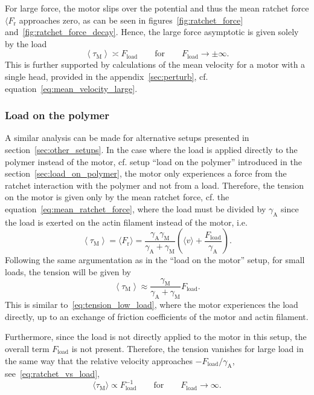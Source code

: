 \documentclass[aps,pre,twocolumn,showpacs,showkeys,superscriptaddress,floatfix]{revtex4-1}
\begin{document}
For large force, the motor slips over the potential and thus the mean ratchet force $\langle F_\text{r}$ approaches zero,
as can be seen in figures~\ref{fig:ratchet_force} and~\ref{fig:ratchet_force_decay}.
Hence, the large force asymptotic is given solely by the load
\begin{equation}
\left\langle \tau_\text{M} \right\rangle
\asymp F_\text{load} 
\qquad \text{for} \qquad F_\text{load} \to \pm \infty. 
\label{eq:tension_large_load}
\end{equation}
This is further supported by calculations of the mean velocity for a motor with a single head, provided in the appendix~\ref{sec:perturb}, cf. equation~\eqref{eq:mean_velocity_large}.


\subsubsection{Load on the polymer}
A similar analysis can be made for alternative setups presented in section~\ref{sec:other_setups}. 
In the case where the load is applied directly to the polymer instead of the motor, cf. setup ``load on the polymer'' introduced in the section~\ref{sec:load_on_polymer}, 
the motor only experiences a force from the ratchet interaction with the polymer and not from a load. 
Therefore, the tension on the motor is given only by the mean ratchet force,  
cf. the equation~\eqref{eq:mean_ratchet_force},  
where the load must be divided by $\gamma_\text{A}$ since the load is exerted on the actin filament instead of the motor,
i.e.
\begin{equation}
\left\langle \tau_\text{M} \right\rangle 
= \langle F_\text{r} \rangle 
= \frac{\gamma_\text{A}\gamma_\text{M}}{\gamma_\text{A} + \gamma_\text{M} } \left(\langle v \rangle + \frac{F_\text{load}}{\gamma_\text{A}}\right) . 
\label{eq:tension_load_on_polymer}
\end{equation}
Following the same argumentation as in the ``load on the motor'' setup, for small loads, the tension will be given by
\begin{equation}
\left\langle \tau_\text{M} \right\rangle
\approx \frac{\gamma_\text{M}}{\gamma_\text{A}+\gamma_\text{M}} F_\text{load}.
\label{eq:tension_low_load_on_polymer}
\end{equation}
This is similar to~\eqref{eq:tension_low_load}, where the motor experiences the load directly, up to an exchange of friction coefficients of the motor and actin filament. 

Furthermore, since the load is not directly applied to the motor in this setup, the overall term $F_\text{load}$ is not present. 
Therefore, the tension vanishes for large load in the same way that the relative velocity approaches $-F_\text{load} / \gamma_\text{A}$, see~\eqref{eq:ratchet_vs_load},
\begin{equation}
\langle \tau_\text{M} \rangle 
\propto
F_\text{load}^{-1}
\qquad\text{for}\qquad
F_\text{load} \to \infty 
.
\label{eq:tension_load_on_polymer_large}
\end{equation}
\end{document}
